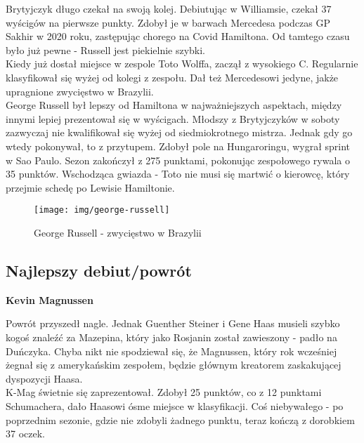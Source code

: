 \documentclass[12pt]{article}
\begin{document}
        Brytyjczyk długo czekał na swoją kolej. Debiutując w Williamsie, czekał 37 wyścigów na pierwsze punkty. Zdobył je w barwach Mercedesa podczas GP Sakhir w 2020 roku, zastępując chorego na Covid Hamiltona. Od tamtego czasu było już pewne - Russell jest piekielnie szybki.\\
        
        Kiedy już dostał miejsce w zespole Toto Wolffa, zaczął z wysokiego C. Regularnie klasyfikował się wyżej od kolegi z zespołu. Dał też Mercedesowi jedyne, jakże upragnione zwycięstwo w Brazylii.\\
        
        George Russell był lepszy od Hamiltona w najważniejszych aspektach, między innymi lepiej prezentował się w wyścigach. Młodszy z Brytyjczyków w soboty zazwyczaj nie kwalifikował się wyżej od siedmiokrotnego mistrza. Jednak gdy go wtedy pokonywał, to z przytupem. Zdobył pole na Hungaroringu, wygrał sprint w Sao Paulo. Sezon zakończył z 275 punktami, pokonując zespołowego rywala o 35 punktów. Wschodząca gwiazda - Toto nie musi się martwić o kierowcę, który przejmie schedę po Lewisie Hamiltonie. 

        \begin{figure}[ht]
            \centering
            \texttt{[image: img/george-russell]}
            \caption{George Russell - zwycięstwo w Brazylii}
            \label{fig:russell}
        \end{figure}
        
    \newpage  
    \subsection{Najlepszy debiut/powrót}
        \begin{center}
            \Huge \textbf{Kevin Magnussen}
        \end{center}

        Powrót przyszedł nagle. Jednak Guenther Steiner i Gene Haas musieli szybko kogoś znaleźć za Mazepina, który jako Rosjanin został zawieszony - padło na Duńczyka. Chyba nikt nie spodziewał się, że Magnussen, który rok wcześniej żegnał się z amerykańskim zespołem, będzie głównym kreatorem zaskakującej dyspozycji Haasa.\\

        K-Mag świetnie się zaprezentował. Zdobył 25 punktów, co z 12 punktami Schumachera, dało Haasowi ósme miejsce w klasyfikacji. Coś niebywałego - po poprzednim sezonie, gdzie nie zdobyli żadnego punktu, teraz kończą z dorobkiem 37 oczek.\\
        
\end{document}
